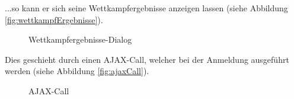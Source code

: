 ...so kann er sich seine Wettkampfergebnisse anzeigen lassen (siehe Abbildung \vref{fig:wettkampfErgebnisse}).
\begin{figure}[!h]
	\caption{Wettkampfergebnisse-Dialog}
	\label{fig:wettkampfErgebnisse}
\end{figure}

Dies geschieht durch einen AJAX-Call, welcher bei der Anmeldung ausgeführt werden (siehe Abbildung \vref{fig:ajaxCall}).

\begin{figure}[!h]
	\caption{AJAX-Call}
	\label{fig:ajaxCall}
\end{figure}

